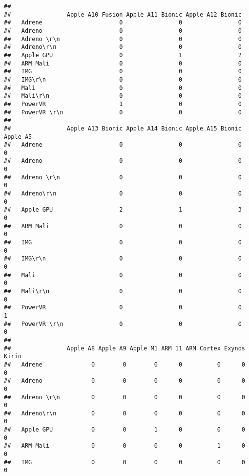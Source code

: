 \documentclass[
]{article}
\begin{document}
\begin{verbatim}
##               
##                Apple A10 Fusion Apple A11 Bionic Apple A12 Bionic
##   Adrene                      0                0                0
##   Adreno                      0                0                0
##   Adreno \r\n                 0                0                0
##   Adreno\r\n                  0                0                0
##   Apple GPU                   0                1                2
##   ARM Mali                    0                0                0
##   IMG                         0                0                0
##   IMG\r\n                     0                0                0
##   Mali                        0                0                0
##   Mali\r\n                    0                0                0
##   PowerVR                     1                0                0
##   PowerVR \r\n                0                0                0
##               
##                Apple A13 Bionic Apple A14 Bionic Apple A15 Bionic Apple A5
##   Adrene                      0                0                0        0
##   Adreno                      0                0                0        0
##   Adreno \r\n                 0                0                0        0
##   Adreno\r\n                  0                0                0        0
##   Apple GPU                   2                1                3        0
##   ARM Mali                    0                0                0        0
##   IMG                         0                0                0        0
##   IMG\r\n                     0                0                0        0
##   Mali                        0                0                0        0
##   Mali\r\n                    0                0                0        0
##   PowerVR                     0                0                0        1
##   PowerVR \r\n                0                0                0        0
##               
##                Apple A8 Apple A9 Apple M1 ARM 11 ARM Cortex Exynos Kirin
##   Adrene              0        0        0      0          0      0     0
##   Adreno              0        0        0      0          0      0     0
##   Adreno \r\n         0        0        0      0          0      0     0
##   Adreno\r\n          0        0        0      0          0      0     0
##   Apple GPU           0        0        1      0          0      0     0
##   ARM Mali            0        0        0      0          1      0     0
##   IMG                 0        0        0      0          0      0     0

\end{verbatim}
\end{document}
